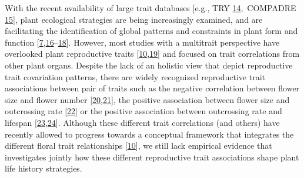 \documentclass[
  12pt,
  a4paper,
]{article}
\begin{document}
With the recent availability of large trait databases {[}e.g., TRY \protect\hyperlink{ref-kattge2011}{14},~COMPADRE \protect\hyperlink{ref-salguero2015}{15}{]}, plant ecological strategies are being increasingly examined, and are facilitating the identification of global patterns and constraints in plant form and function {[}\protect\hyperlink{ref-salguero2016}{7},\protect\hyperlink{ref-diaz2016}{16}--\protect\hyperlink{ref-carmona2021}{18}{]}. However, most studies with a multitrait perspective have overlooked plant reproductive traits {[}\protect\hyperlink{ref-roddy2021}{10},\protect\hyperlink{ref-evojtko2020}{19}{]} and focused on trait correlations from other plant organs. Despite the lack of an holistic view that depict reproductive trait covariation patterns, there are widely recognized reproductive trait associations between pair of traits such as the negative correlation between flower size and flower number {[}\protect\hyperlink{ref-sargent2007}{20},\protect\hyperlink{ref-kettle2011}{21}{]}, the positive association between flower size and outcrossing rate {[}\protect\hyperlink{ref-goodwillie2010}{22}{]} or the positive association between outcrossing rate and lifespan {[}\protect\hyperlink{ref-barrett2003}{23},\protect\hyperlink{ref-moeller2017}{24}{]}. Although these different trait correlations (and others) have recently allowed to progress towards a conceptual framework that integrates the different floral trait relationships {[}\protect\hyperlink{ref-roddy2021}{10}{]}, we still lack empirical evidence that investigates jointly how these different reproductive trait associations shape plant life history strategies.
\end{document}
